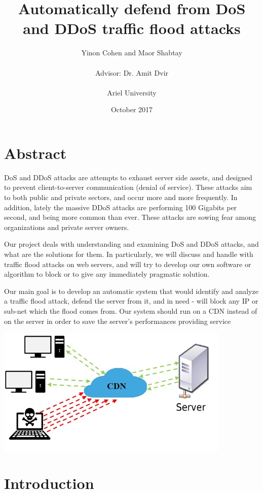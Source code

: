 \documentclass{report}
\title{Automatically defend from DoS and DDoS traffic flood attacks}
\author{Yinon Cohen and Maor Shabtay\\\\{ Advisor: Dr. Amit Dvir}\\\\{Ariel University}}
\date{October 2017}
\begin{document}
\maketitle

\tableofcontents
{}


\newpage

\chapter {Abstract}
\hfill \break \gls{DoS} and \gls{DDoS} attacks are attempts to exhaust server side assets, and designed to prevent client-to-server communication (denial of service). These attacks aim to both public and private sectors, and occur more and more frequently. In addition, lately the massive \gls{DDoS} attacks are performing 100 Gigabits per second, and being more common than ever. These attacks are sowing fear among organizations and private server owners.

\hfill \break Our project deals with understanding and examining \gls{DoS} and \gls{DDoS} attacks, and what are the solutions for them. In particularly, we will discuss and handle with traffic flood attacks on web servers, and will try to develop our own software or algorithm to block or to give any immediately pragmatic solution.

\hfill \break Our main goal is to develop an automatic system that would identify and analyze a traffic flood attack, defend the server from it, and in need - will block any \gls{IP} or sub-net which the flood comes from. Our system should run on a \gls{CDN} instead of on the server in order to save the server’s performances providing service
\hfill \break \hfill \break
    \begin{center}
        \includegraphics{pi}
    \end{center}
\newpage
\chapter {Introduction}
\end{document}
